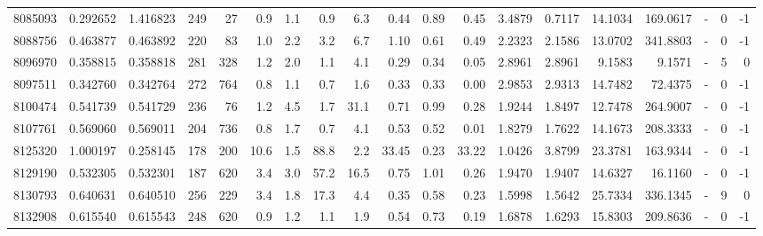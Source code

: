 \begin{tabular}{rrrrrrrrrrrrrrrrlrr}
   8085093 & 0.292652 &   1.416823 &  249 &   27 &      0.9 &      1.1 &     0.9 &      6.3 &       0.44 &        0.89 &        0.45 &  3.4879 &  0.7117 &   14.1034 &  169.0617 &             - &        0 &         -1 \\
   8088756 & 0.463877 &   0.463892 &  220 &   83 &      1.0 &      2.2 &     3.2 &      6.7 &       1.10 &        0.61 &        0.49 &  2.2323 &  2.1586 &   13.0702 &  341.8803 &             - &        0 &         -1 \\
   8096970 & 0.358815 &   0.358818 &  281 &  328 &      1.2 &      2.0 &     1.1 &      4.1 &       0.29 &        0.34 &        0.05 &  2.8961 &  2.8961 &    9.1583 &    9.1571 &             - &        5 &          0 \\
   8097511 & 0.342760 &   0.342764 &  272 &  764 &      0.8 &      1.1 &     0.7 &      1.6 &       0.33 &        0.33 &        0.00 &  2.9853 &  2.9313 &   14.7482 &   72.4375 &             - &        0 &         -1 \\
   8100474 & 0.541739 &   0.541729 &  236 &   76 &      1.2 &      4.5 &     1.7 &     31.1 &       0.71 &        0.99 &        0.28 &  1.9244 &  1.8497 &   12.7478 &  264.9007 &             - &        0 &         -1 \\
   8107761 & 0.569060 &   0.569011 &  204 &  736 &      0.8 &      1.7 &     0.7 &      4.1 &       0.53 &        0.52 &        0.01 &  1.8279 &  1.7622 &   14.1673 &  208.3333 &             - &        0 &         -1 \\
   8125320 & 1.000197 &   0.258145 &  178 &  200 &     10.6 &      1.5 &    88.8 &      2.2 &      33.45 &        0.23 &       33.22 &  1.0426 &  3.8799 &   23.3781 &  163.9344 &             - &        0 &         -1 \\
   8129190 & 0.532305 &   0.532301 &  187 &  620 &      3.4 &      3.0 &    57.2 &     16.5 &       0.75 &        1.01 &        0.26 &  1.9470 &  1.9407 &   14.6327 &   16.1160 &             - &        0 &         -1 \\
   8130793 & 0.640631 &   0.640510 &  256 &  229 &      3.4 &      1.8 &    17.3 &      4.4 &       0.35 &        0.58 &        0.23 &  1.5998 &  1.5642 &   25.7334 &  336.1345 &             - &        9 &          0 \\
   8132908 & 0.615540 &   0.615543 &  248 &  620 &      0.9 &      1.2 &     1.1 &      1.9 &       0.54 &        0.73 &        0.19 &  1.6878 &  1.6293 &   15.8303 &  209.8636 &             - &        0 &         -1 \\

\end{tabular}
